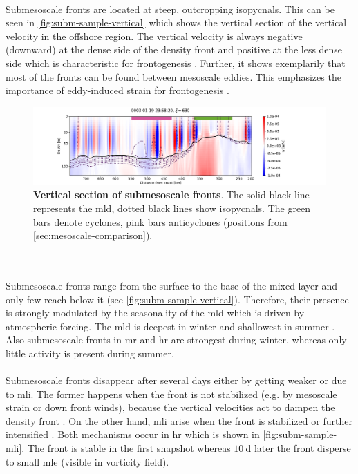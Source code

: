 \\
Submesoscale fronts are located at steep, outcropping isopycnals. This can be seen in \autoref{fig:subm-sample-vertical} which shows the vertical section of the vertical velocity in the offshore region. The vertical velocity is always negative (downward) at the dense side of the density front and positive at the less dense side which is characteristic for frontogenesis \autocite{thomas-2008-subm}. Further, it shows exemplarily that most of the fronts can be found between mesoscale eddies. This emphasizes the importance of eddy-induced strain for frontogenesis \autocite{thomas-2008-subm}.\\
\begin{figure}
    \centering
    \hspace*{0.7cm}\includegraphics[width=17cm, trim=2.3cm 0 0 0]{../figures/result_snapshot-vert-p15}
    \caption[Vertical section of submesoscale fronts]{\textbf{Vertical section of submesoscale fronts}. The solid black line represents the \ac{mld}, dotted black lines show isopycnals. The green bars denote cyclones, pink bars anticyclones (positions from \autoref{sec:mesoscale-comparison}).}\label{fig:subm-sample-vertical}
\end{figure}
\\
\\
Submesoscale fronts range from the surface to the base of the mixed layer and only few reach below it (see \autoref{fig:subm-sample-vertical}). Therefore, their presence is strongly modulated by the seasonality of the \ac{mld} which is driven by atmospheric forcing. The \ac{mld} is deepest in winter and shallowest in summer \autocite{callies-2015-seasonality-subm}. Also submesoscale fronts in \ac{mr} and \ac{hr} are strongest during winter, whereas only little activity is present during summer.\\
\\
Submesoscale fronts disappear after several days either by getting weaker or due to \ac{mli}. The former happens when the front is not stabilized (e.g. by mesoscale strain or down front winds), because the vertical velocities act to dampen the density front \autocite{thomas-2008-subm}. On the other hand, \ac{mli} arise when the front is stabilized or further intensified \autocite{boccaletti-2007}. Both mechanisms occur in \ac{hr} which is shown in \autoref{fig:subm-sample-mli}. The front is stable in the first snapshot whereas $\SI{10}{\day}$ later the front disperse to small \ac{mle} (visible in vorticity field).
